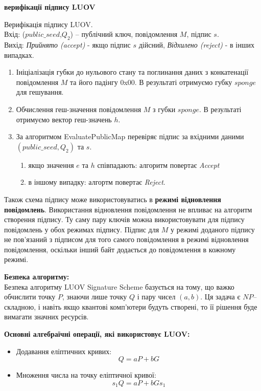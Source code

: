 \newpage
\textbf{ верифікації підпису LUOV\\}
\vspace{-0.5cm}
\begin{algorithm}{
Верифікація підпису LUOV.\\
Вхід: ($public\_seed$,$Q_2$) -- публічний ключ, повідомлення $M$, підпис $s$. \\
Вихід: \textit{Прийнято (accept)} - якщо підпис $s$ дійсний, \textit{Відхилено (reject)} - в інших випадках.
\begin{enumerate}
    \item Ініціалізація губки до нульового стану та поглинання даних з конкатенації повідомлення $M$ та його падінгу 0x00. В результаті отримуємо губку $sponge$ для гешування.
    \item Обчислення геш-значення повідомлення $M$ з губки $sponge$. В результаті отримуємо вектор геш-значень $h$.
    \item За алгоритмом EvaluatePublicMap перевіряє підпис за вхідними даними $(public\_seed, Q_2)$ та $s$.
    \begin{enumerate}
        \item якщо значення $e$ та $h$ співпадають: алгоритм повертає \textit{Accept}
        \item в іншому випадку: алгортм повертає \textit{Reject}.
    \end{enumerate}
\end{enumerate}}
\end{algorithm}

Також схема підпису може використовуватись в \textbf{режимі відновлення повідомлень}. Використання відновлення повідомлення не впливає на алгоритм створення підпису. Ту саму пару ключів можна використовувати для підпису повідомлень у обох режимах підпису. Підпис для $M$ у режимі доданого підпису не пов’язаний з підписом для того самого повідомлення в режимі відновлення повідомлення, оскільки інший байт додається до повідомлення в кожному режимі.

\textbf{Безпека алгоритму:} \\
Безпека алгоритму LUOV Signature Scheme базується на тому, що важко обчислити точку $P$, знаючи лише точку $Q$ і пару чисел $(a,b)$. Ця задача є $NP$--складною, і навіть якщо квантові комп’ютери будуть створені, то її рішення буде вимагати значних ресурсів.

\textbf{Основні алгебраїчні операції, які використовує LUOV:}
\begin{itemize}
    \item Додавання еліптичних кривих:
    \begin{equation}
    Q = aP + bG
    \end{equation}
    \item Множення числа на точку еліптичної кривої:
    \begin{equation}
    s_1Q = aP + bGs_1
    \end{equation}
\end{itemize}

